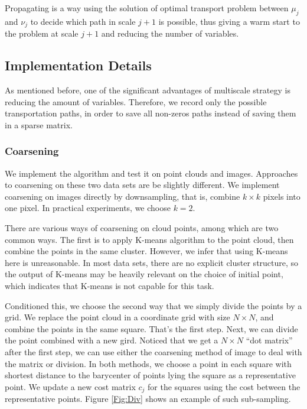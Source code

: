 \documentclass[english]{pkupaper}
\begin{document}
Propagating is a way using the solution of optimal transport problem between $\mu_j$ and $\nu_j$ to decide which path in scale $j+1$ is possible, thus giving a warm start to the problem at scale $j+1$ and reducing the number of variables.

\subsection{Implementation Details}

As mentioned before, one of the significant advantages of multiscale strategy is reducing the amount of variables. Therefore, we record only the possible transportation paths, in order to save all non-zeros paths instead of saving them in a sparse matrix.

\subsubsection{Coarsening}

We implement the algorithm and test it on point clouds and images. Approaches to coarsening on these two data sets are be slightly different. We implement coarsening on images directly by downsampling, that is, combine $k\times k$ pixels into one pixel. In practical experiments, we choose $k =2$.

There are various ways of coarsening on cloud points, among which are two common ways. The first is to apply K-means algorithm to the point cloud, then combine the points in the same cluster. However, we infer that using K-means here is unreasonable. In most data sets, there are no explicit cluster structure, so the output of K-means may be heavily relevant on the choice of initial point, which indicates that K-means is not capable for this task.

Conditioned this, we choose the second way that we simply divide the points by a grid. We replace the point cloud in a coordinate grid with size $N\times N$, and combine the points in the same square. That's the first step. Next, we can divide the point combined with a new gird. Noticed that we get a $N\times N$ ``dot matrix'' after the first step, we can use either the coarsening method of image to deal with the matrix or division. In both methods, we choose a point in each square with shortest distance to the barycenter of points lying the square as a representative point. We update a new cost matrix $c_j$ for the squares using the cost between the representative points. Figure \ref{Fig:Div} shows an example of such sub-sampling.
\end{document}
